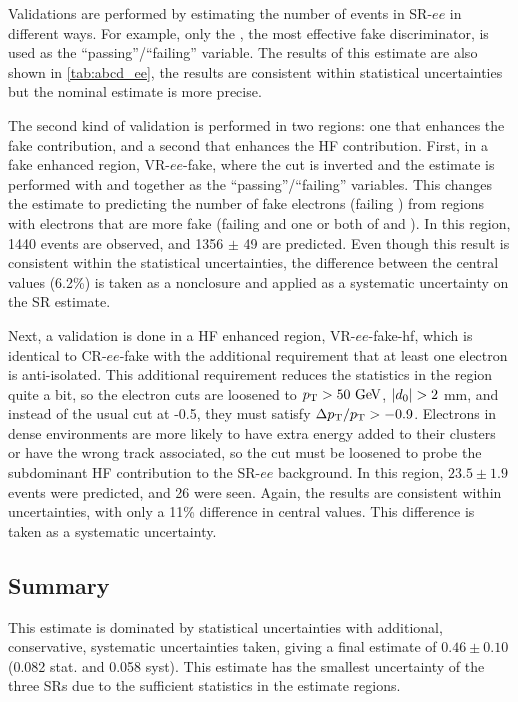 Validations are performed by estimating the number of events in SR-$ee$ in different ways. For example, only the \dpt, the most effective fake discriminator, is used as the ``passing''/``failing'' variable. The results of this estimate are also shown in \autoref{tab:abcd_ee}, the results are consistent within statistical uncertainties but the nominal estimate is more precise.

The second kind of validation is performed in two regions: one that enhances the fake contribution, and a second that enhances the \ac{HF} contribution. First, in a fake enhanced region, VR-$ee$-fake, where the \dpt cut is inverted and the estimate is performed with \chiID and \nmiss together as the ``passing''/``failing'' variables. This changes the estimate to predicting the number of fake electrons (failing \dpt) from regions with electrons that are more fake (failing \dpt and one or both of \chiID and \nmiss). In this region, 1440 events are observed, and 1356 $\pm$ 49 are predicted. Even though this result is consistent within the statistical uncertainties, the difference between the central values (6.2\%) is taken as a nonclosure and applied as a systematic uncertainty on the \ac{SR} estimate.

Next, a validation is done in a \ac{HF} enhanced region, VR-$ee$-fake-hf, which is identical to CR-$ee$-fake with the additional requirement that at least one electron is anti-isolated. This additional requirement reduces the statistics in the region quite a bit, so the electron cuts are loosened to $\pt>50\gev$, $|d_0| > 2$ mm, and instead of the usual \dpt cut at -0.5, they must satisfy $\Delta p_{\text{T}}/p_{\text{T}}>-0.9$. Electrons in dense environments are more likely to have extra energy added to their clusters or have the wrong track associated, so the \dpt cut must be loosened to probe the subdominant \ac{HF} contribution to the SR-$ee$ background. In this region, $23.5\pm1.9$ events were predicted, and 26 were seen. Again, the results are consistent within uncertainties, with only a 11\% difference in central values. This difference is taken as a systematic uncertainty.

\subsection{Summary}

This estimate is dominated by statistical uncertainties with additional, conservative, systematic uncertainties taken, giving a final estimate of $0.46 \pm 0.10$ (0.082 stat. and 0.058 syst). This estimate has the smallest uncertainty of the three \acp{SR} due to the sufficient statistics in the estimate regions.

